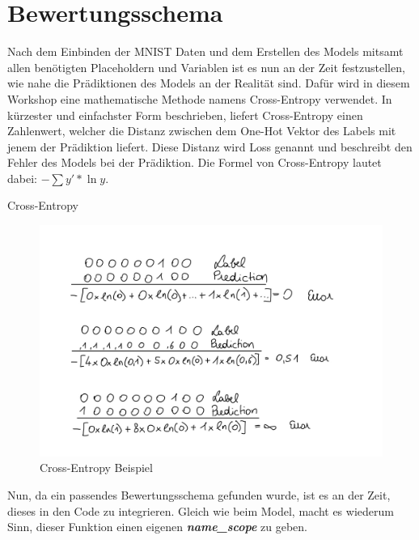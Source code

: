 \chapter{Bewertungsschema}

Nach dem Einbinden der MNIST Daten und dem Erstellen des Models mitsamt allen benötigten Placeholdern und Variablen ist es nun an der Zeit festzustellen, wie nahe die Prädiktionen des Models an der Realität sind. Dafür wird in diesem Workshop eine mathematische Methode namens Cross-Entropy verwendet. In kürzester und einfachster Form beschrieben, liefert Cross-Entropy einen Zahlenwert, welcher die Distanz zwischen dem One-Hot Vektor des Labels mit jenem der Prädiktion liefert. Diese Distanz wird Loss genannt und beschreibt den Fehler des Models bei der Prädiktion. Die Formel von Cross-Entropy lautet dabei: $ - \sum{y' * \ln{y}}$. 

Cross-Entropy
\begin{figure}[!ht]
\centering
\includegraphics[width=1.00\textwidth]{images/crossEntropy}
\caption{Cross-Entropy Beispiel}
\label{fig:cross_entropy}
\end{figure}

Nun, da ein passendes Bewertungsschema gefunden wurde, ist es an der Zeit, dieses in den Code zu integrieren. Gleich wie beim Model, macht es wiederum Sinn, dieser Funktion einen eigenen \textbf{\textit{name\_scope}} zu geben.

\lstset{language=Python}


